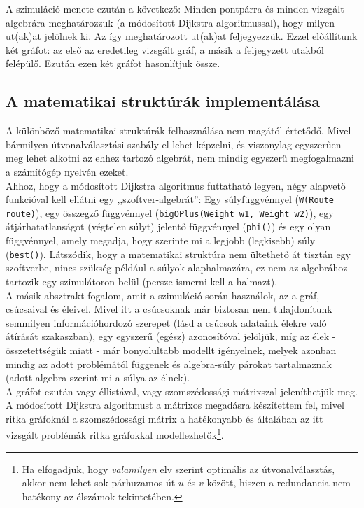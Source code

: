   A szimuláció menete ezután a következő: Minden pontpárra és minden vizsgált algebrára meghatározzuk (a módosított Dijkstra algoritmussal), hogy milyen ut(ak)at jelölnek ki. Az így meghatározott ut(ak)at feljegyezzük. Ezzel előállítunk két gráfot: az első az eredetileg vizsgált gráf, a másik a feljegyzett utakból felépülő. Ezután ezen két gráfot hasonlítjuk össze.

    \subsection{A matematikai struktúrák implementálása}
    A különböző matematikai struktúrák felhasználása nem magától értetődő. Mivel bármilyen útvonalválasztási szabály el lehet képzelni, és viszonylag egyszerűen meg lehet alkotni az ehhez tartozó algebrát, nem mindig egyszerű megfogalmazni a számítógép nyelvén ezeket.\\
    Ahhoz, hogy a módosított Dijkstra algoritmus futtatható legyen, négy alapvető funkcióval kell ellátni egy ,,szoftver-algebrát'': Egy súlyfüggvénnyel (\texttt{W(Route route)}), egy összegző függvénnyel (\texttt{bigOPlus(Weight w1, Weight w2)}), egy átjárhatatlanságot (végtelen súlyt) jelentő függvénnyel (\texttt{phi()}) és egy olyan függvénnyel, amely megadja, hogy szerinte mi a legjobb (legkisebb) súly (\texttt{best()}). Látszódik, hogy a matematikai struktúra nem ültethető át tisztán egy szoftverbe, nincs szükség például a súlyok alaphalmazára, ez nem az algebrához tartozik egy szimulátoron belül (persze ismerni kell a halmazt).\\

    A másik absztrakt fogalom, amit a szimuláció során használok, az a gráf, csúcsaival és éleivel. Mivel itt a csúcsoknak már biztosan nem tulajdonítunk semmilyen információhordozó szerepet (lásd a csúcsok adataink élekre való átírását  szakaszban), egy egyszerű (egész) azonosítóval jelöljük, míg az élek - összetettségük miatt - már bonyolultabb modellt igényelnek, melyek azonban mindig az adott problémától függenek és algebra-súly párokat tartalmaznak (adott algebra szerint mi a súlya az élnek).\\
    A gráfot ezután vagy éllistával, vagy szomszédossági mátrixszal jeleníthetjük meg. A módosított Dijkstra algoritmust a mátrixos megadásra készítettem fel, mivel ritka gráfoknál a szomszédossági mátrix a hatékonyabb és általában az itt vizsgált problémák ritka gráfokkal modellezhetők\footnote{Ha elfogadjuk, hogy \textit{valamilyen} elv szerint optimális az útvonalválasztás, akkor nem lehet sok párhuzamos út $u$ és $v$ között, hiszen a redundancia nem hatékony az élszámok tekintetében.}.

